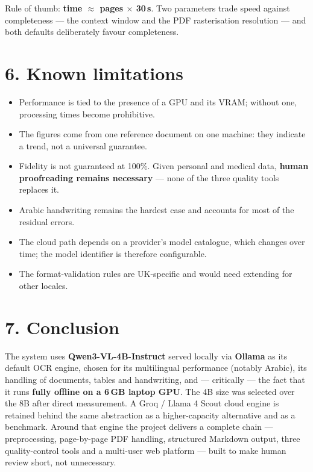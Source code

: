 \documentclass[10pt,a4paper]{article}
\begin{document}
Rule of thumb: \textbf{time $\approx$ pages $\times$ 30\,s}. Two parameters
trade speed against completeness --- the context window and the PDF
rasterisation resolution --- and both defaults deliberately favour
completeness.

\section*{6. Known limitations}

\begin{itemize}
  \item Performance is tied to the presence of a GPU and its VRAM; without one,
        processing times become prohibitive.
  \item The figures come from one reference document on one machine: they
        indicate a trend, not a universal guarantee.
  \item Fidelity is not guaranteed at 100\%. Given personal and medical data,
        \textbf{human proofreading remains necessary} --- none of the three
        quality tools replaces it.
  \item Arabic handwriting remains the hardest case and accounts for most of the
        residual errors.
  \item The cloud path depends on a provider's model catalogue, which changes
        over time; the model identifier is therefore configurable.
  \item The format-validation rules are UK-specific and would need extending for
        other locales.
\end{itemize}

\section*{7. Conclusion}

The system uses \textbf{Qwen3-VL-4B-Instruct} served locally via
\textbf{Ollama} as its default OCR engine, chosen for its multilingual
performance (notably Arabic), its handling of documents, tables and
handwriting, and --- critically --- the fact that it runs \textbf{fully offline
on a 6\,GB laptop GPU}. The 4B size was selected over the 8B after direct
measurement. A Groq / Llama 4 Scout cloud engine is retained behind the same
abstraction as a higher-capacity alternative and as a benchmark. Around that
engine the project delivers a complete chain --- preprocessing, page-by-page
PDF handling, structured Markdown output, three quality-control tools and a
multi-user web platform --- built to make human review short, not unnecessary.
\end{document}
